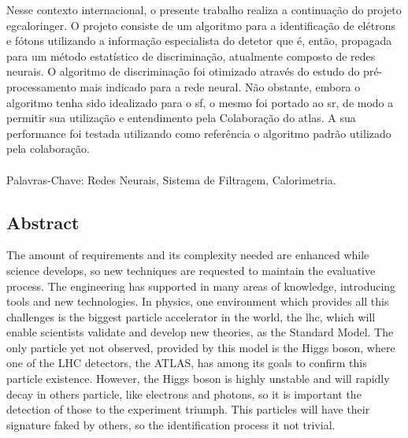 Nesse contexto internacional, o presente trabalho realiza a continuação
do projeto \acrshort{egcaloringer}. O projeto consiste de um algoritmo 
para a identificação de elétrons e fótons utilizando a informação especialista 
do detetor que é, então, propagada para um método estatístico de discriminação, 
atualmente composto de redes neurais. O algoritmo de discriminação foi otimizado 
através do estudo do pré-processamento mais indicado para a rede neural. 
Não obstante, embora o algoritmo tenha sido idealizado para o \gls{sf}, 
o mesmo foi portado ao \gls{sr}, de modo a permitir sua utilização e 
entendimento pela Colaboração do \acrshort{atlas}. A sua performance foi 
testada utilizando como referência o algoritmo padrão utilizado 
pela colaboração.

\paragraph*{}

\noindent Palavras-Chave: Redes Neurais, Sistema de Filtragem, Calorimetria.

\vfill

\cleardoublepage

\vfill
\begin{center}
\section*{Abstract\label{Abstract}}
\end{center}

The amount of requirements and its complexity needed are enhanced while science
develops, so new techniques are requested to maintain the evaluative process.
The engineering has supported in many areas of knowledge, introducing tools and
new technologies.
In physics, one environment which provides all this challenges is the biggest
particle accelerator in the world, the \acrshort{lhc}, which will enable
scientists validate and develop new theories, as the Standard Model. The only
particle yet not observed, provided by this model is the Higgs boson, where
one of the LHC detectors, the ATLAS, has among its goals to confirm this
particle existence. However, the Higgs boson is highly unstable and will rapidly
decay in others particle, like electrons and photons, so it is important the
detection of those to the experiment triumph. This particles will have their
signature faked by others, so the identification process it not trivial.

